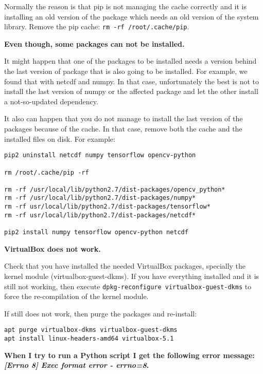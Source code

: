 \documentclass[a4paper,12pt]{article}
\begin{document}
Normally the reason is that pip is not managing the cache correctly and it is installing an old version of the package which needs an old version of the system library. Remove the pip cache: {\tt rm -rf /root/.cache/pip}.
\vspace{0.5cm}

\textbf{Even though, some packages can not be installed.}

It might happen that one of the packages to be installed needs a version behind the last version of package that is also going to be installed. For example, we found that with netcdf and numpy. In that case, unfortunately the best is not to install the last version of numpy or the affected package and let the other install a not-so-updated dependency.

It also can happen that you do not manage to install the last version of the packages because of the cache. In that case, remove both the cache and the installed files on disk. For example:

\begin{verbatim}
pip2 uninstall netcdf numpy tensorflow opencv-python

rm /root/.cache/pip -rf

rm -rf /usr/local/lib/python2.7/dist-packages/opencv_python*
rm -rf /usr/local/lib/python2.7/dist-packages/numpy*
rm -rf usr/local/lib/python2.7/dist-packages/tensorflow*
rm -rf usr/local/lib/python2.7/dist-packages/netcdf*

pip2 install numpy tensorflow opencv-python netcdf
\end{verbatim}
\vspace{0.5cm}

\textbf{VirtualBox does not work.}

Check that you have installed the needed VirtualBox packages, specially the kernel module (virtualbox-guest-dkms).
If you have everything installed and it is still not working, then execute {\tt dpkg-reconfigure virtualbox-guest-dkms} to force the re-compilation of the kernel module.

If still does not work, then purge the packages and re-install:

\begin{verbatim}
apt purge virtualbox-dkms virtualbox-guest-dkms
apt install linux-headers-amd64 virtualbox-5.1
\end{verbatim}
\vspace{0.5cm}

\textbf{When I try to run a Python script I get the following error message: \emph{[Errno 8] Exec format error - errno=8}.}
\end{document}
